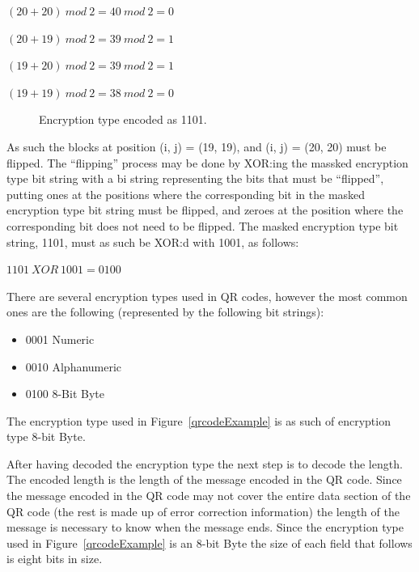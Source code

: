 \begin{center}

\((20+20)~mod~2=40~mod~2=0\)

\((20+19)~mod~2=39~mod~2=1\)

\((19+20)~mod~2=39~mod~2=1\)

\((19+19)~mod~2=38~mod~2=0\)

\end{center}

	\begin{figure}[H]%
		\centering
		\caption{Encryption type encoded as 1101.}
		\label{qrcodeExampleStep4}
	\end{figure}

As such the blocks at position (i, j) = (19, 19), and (i, j) = (20, 20) must be flipped. The ``flipping'' process may be done by XOR:ing the massked encryption type bit string with a bi string representing the bits that must be ``flipped'', putting ones at the positions where the corresponding bit in the masked encryption type bit string must be flipped, and zeroes at the position where the corresponding bit does not need to be flipped. The masked encryption type bit string, 1101, must as such be XOR:d with 1001, as follows:

\begin{center}
\(1101~XOR~1001=0100\)
\end{center}

There are several encryption types used in QR codes, however the most common ones are the following (represented by the following bit strings):

\begin{itemize}
	\item 0001 Numeric
	\item 0010 Alphanumeric
	\item 0100 8-Bit Byte
\end{itemize}

The encryption type used in Figure~\ref{qrcodeExample} is as such of encryption type 8-bit Byte.

After having decoded the encryption type the next step is to decode the length. The encoded length is the length of the message encoded in the QR code. Since the message encoded in the QR code may not cover the entire data section of the QR code (the rest is made up of error correction information) the length of the message is necessary to know when the message ends. Since the encryption type used in Figure~\ref{qrcodeExample} is an 8-bit Byte the size of each field that follows is eight bits in size.

